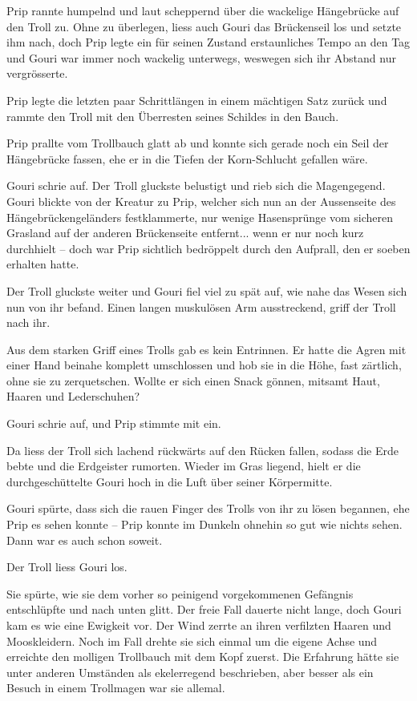 Prip rannte humpelnd und laut scheppernd über die wackelige Hängebrücke auf den Troll zu. Ohne zu überlegen, liess auch Gouri das Brückenseil los und setzte ihm nach, doch Prip legte ein für seinen Zustand erstaunliches Tempo an den Tag und Gouri war immer noch wackelig unterwegs, weswegen sich ihr Abstand nur vergrösserte.

Prip legte die letzten paar Schrittlängen in einem mächtigen Satz zurück und rammte den Troll mit den Überresten seines Schildes in den Bauch.

Prip prallte vom Trollbauch glatt ab und konnte sich gerade noch ein Seil der Hängebrücke fassen, ehe er in die Tiefen der Korn-Schlucht gefallen wäre.

Gouri schrie auf. Der Troll gluckste belustigt und rieb sich die Magengegend. Gouri blickte von der Kreatur zu Prip, welcher sich nun an der Aussenseite des Hängebrückengeländers festklammerte, nur wenige Hasensprünge vom sicheren Grasland auf der anderen Brückenseite entfernt... wenn er nur noch kurz durchhielt – doch war Prip sichtlich bedröppelt durch den Aufprall, den er soeben erhalten hatte.

Der Troll gluckste weiter und Gouri fiel viel zu spät auf, wie nahe das Wesen sich nun von ihr befand. Einen langen muskulösen Arm ausstreckend, griff der Troll nach ihr.

Aus dem starken Griff eines Trolls gab es kein Entrinnen. Er hatte die Agren mit einer Hand beinahe komplett umschlossen und hob sie in die Höhe, fast zärtlich, ohne sie zu zerquetschen. Wollte er sich einen Snack gönnen, mitsamt Haut, Haaren und Lederschuhen?

Gouri schrie auf, und Prip stimmte mit ein.

Da liess der Troll sich lachend rückwärts auf den Rücken fallen, sodass die Erde bebte und die Erdgeister rumorten. Wieder im Gras liegend, hielt er die durchgeschüttelte Gouri hoch in die Luft über seiner Körpermitte.

Gouri spürte, dass sich die rauen Finger des Trolls von ihr zu lösen begannen, ehe Prip es sehen konnte – Prip konnte im Dunkeln ohnehin so gut wie nichts sehen. Dann war es auch schon soweit.

Der Troll liess Gouri los.

Sie spürte, wie sie dem vorher so peinigend vorgekommenen Gefängnis entschlüpfte und nach unten glitt. Der freie Fall dauerte nicht lange, doch Gouri kam es wie eine Ewigkeit vor. Der Wind zerrte an ihren verfilzten Haaren und Mooskleidern. Noch im Fall drehte sie sich einmal um die eigene Achse und erreichte den molligen Trollbauch mit dem Kopf zuerst. Die Erfahrung hätte sie unter anderen Umständen als ekelerregend beschrieben, aber besser als ein Besuch in einem Trollmagen war sie allemal.

